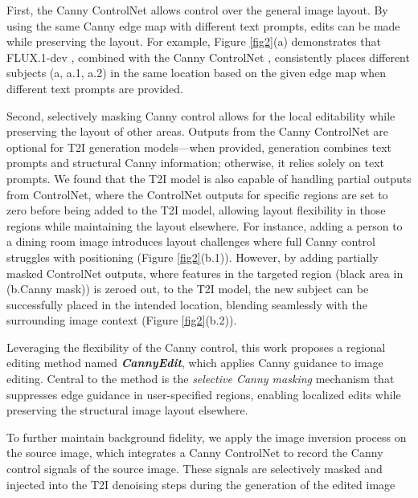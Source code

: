 \documentclass{article}
\begin{document}
First, the Canny ControlNet allows control over the general image layout. By using the same Canny edge map with different text prompts, edits can be made while preserving the layout. For example, Figure \ref{fig2}(a) demonstrates that FLUX.1-dev \citep{blackforest2024flux}, combined with the Canny ControlNet \citep{xlabsai2025fluxcontrolnet}, consistently places different subjects (a, a.1, a.2) in the same location based on the given edge map when different text prompts are provided.

Second, selectively masking Canny control allows for the local editability while preserving the layout of other areas. Outputs from the Canny ControlNet are optional for T2I generation models—when provided, generation combines text prompts and structural Canny information; otherwise, it relies solely on text prompts. We found that the T2I model is also capable of handling partial outputs from ControlNet, where the ControlNet outputs for specific regions are set to zero before being added to the T2I model, allowing layout flexibility in those regions while maintaining the layout elsewhere. For instance, adding a person to a dining room image introduces layout challenges where full Canny control struggles with positioning (Figure \ref{fig2}(b.1)). However, by adding partially masked ControlNet outputs, where features in the targeted region (black area in (b.Canny mask)) is zeroed out, to the T2I model, the new subject can be successfully placed in the intended location, blending seamlessly with the surrounding image context (Figure \ref{fig2}(b.2)).



Leveraging the flexibility of the Canny control, this work proposes a regional editing method named \textbf{\textit{CannyEdit}}, which applies Canny guidance to image editing. Central to the method is the \textit{selective Canny masking} mechanism that suppresses edge guidance in user-specified regions, enabling localized edits while preserving the structural image layout elsewhere. 

To further maintain background fidelity, we apply the image inversion process on the source image, which integrates a Canny ControlNet to record the Canny control signals of the source image. These signals are selectively masked and injected into the T2I denoising steps during the generation of the edited image

\end{document}
